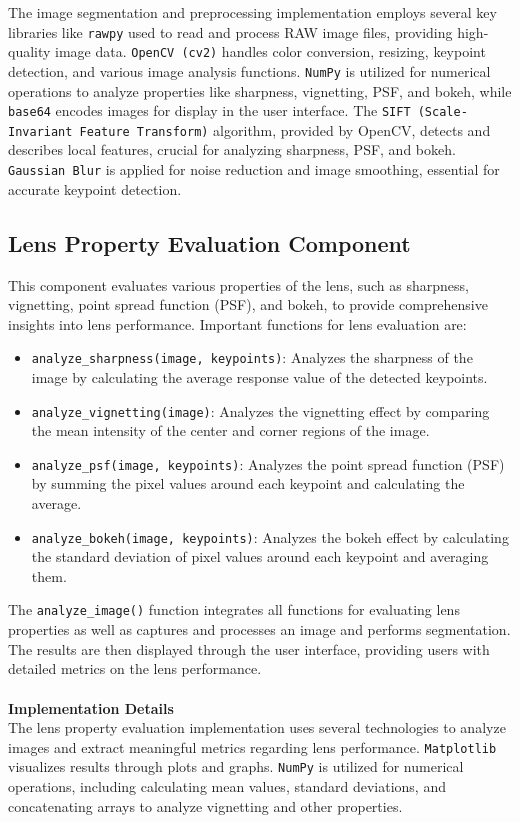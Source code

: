 The image segmentation and preprocessing implementation employs several key libraries like \texttt{rawpy} used to read and process RAW image files, providing high-quality image data. \texttt{OpenCV (cv2)} handles color conversion, resizing, keypoint detection, and various image analysis functions. \texttt{NumPy} is utilized for numerical operations to analyze properties like sharpness, vignetting, PSF, and bokeh, while \texttt{base64} encodes images for display in the user interface. The \texttt{SIFT (Scale-Invariant Feature Transform)} algorithm, provided by OpenCV, detects and describes local features, crucial for analyzing sharpness, PSF, and bokeh. \texttt{Gaussian Blur} is applied for noise reduction and image smoothing, essential for accurate keypoint detection.

\subsection{Lens Property Evaluation Component}
This component evaluates various properties of the lens, such as sharpness, vignetting, point spread function (PSF), and bokeh, to provide comprehensive insights into lens performance. Important functions for lens evaluation are: 

\begin{itemize}
    \item \texttt{analyze\_sharpness(image, keypoints)}: Analyzes the sharpness of the image by calculating the average response value of the detected keypoints.
    \item \texttt{analyze\_vignetting(image)}: Analyzes the vignetting effect by comparing the mean intensity of the center and corner regions of the image.
    \item \texttt{analyze\_psf(image, keypoints)}: Analyzes the point spread function (PSF) by summing the pixel values around each keypoint and calculating the average.
    \item \texttt{analyze\_bokeh(image, keypoints)}: Analyzes the bokeh effect by calculating the standard deviation of pixel values around each keypoint and averaging them.
\end{itemize}
The \texttt{analyze\_image()} function integrates all functions for evaluating lens properties as well as captures and processes an image and performs segmentation. The results are then displayed through the user interface, providing users with detailed metrics on the lens performance.
\\
\\
\textbf{Implementation Details}
\\
The lens property evaluation implementation uses several technologies to analyze images and extract meaningful metrics regarding lens performance. \texttt{Matplotlib} visualizes results through plots and graphs. \texttt{NumPy} is utilized for numerical operations, including calculating mean values, standard deviations, and concatenating arrays to analyze vignetting and other properties.

